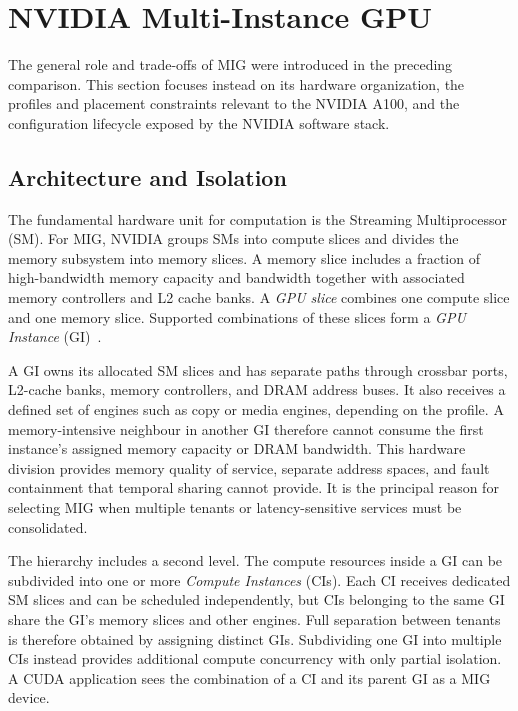 \section{NVIDIA Multi-Instance GPU}
\label{sec:mig}

The general role and trade-offs of MIG were introduced in the preceding comparison. This section focuses instead on its hardware organization, the profiles and placement constraints relevant to the NVIDIA A100, and the configuration lifecycle exposed by the NVIDIA software stack.

\subsection{Architecture and Isolation}

The fundamental hardware unit for computation is the Streaming Multiprocessor (SM). For MIG, NVIDIA groups SMs into compute slices and divides the memory subsystem into memory slices. A memory slice includes a fraction of high-bandwidth memory capacity and bandwidth together with associated memory controllers and L2 cache banks. A \emph{GPU slice} combines one compute slice and one memory slice. Supported combinations of these slices form a \emph{GPU Instance} (GI)~\cite{nvidia2026migconcepts}.

A GI owns its allocated SM slices and has separate paths through crossbar ports, L2-cache banks, memory controllers, and DRAM address buses. It also receives a defined set of engines such as copy or media engines, depending on the profile. A memory-intensive neighbour in another GI therefore cannot consume the first instance's assigned memory capacity or DRAM bandwidth. This hardware division provides memory quality of service, separate address spaces, and fault containment that temporal sharing cannot provide. It is the principal reason for selecting MIG when multiple tenants or latency-sensitive services must be consolidated.

The hierarchy includes a second level. The compute resources inside a GI can be subdivided into one or more \emph{Compute Instances} (CIs). Each CI receives dedicated SM slices and can be scheduled independently, but CIs belonging to the same GI share the GI's memory slices and other engines. Full separation between tenants is therefore obtained by assigning distinct GIs. Subdividing one GI into multiple CIs instead provides additional compute concurrency with only partial isolation. A CUDA application sees the combination of a CI and its parent GI as a MIG device.

